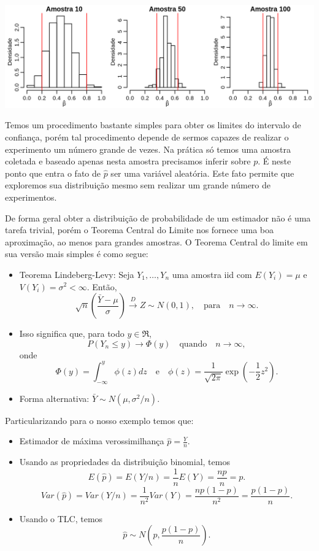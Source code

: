 \documentclass[10pt,a4paper]{book}
\providecommand{\tightlist}{%
  \setlength{\itemsep}{0pt}\setlength{\parskip}{0pt}}
\begin{document}
\begin{center}\includegraphics[width=0.99\linewidth]{figures/unnamed-chunk-382-1} \end{center}

Temos um procedimento bastante simples para obter os limites do
intervalo de confiança, porém tal procedimento depende de sermos capazes
de realizar o experimento um número grande de vezes. Na prática só temos
uma amostra coletada e baseado apenas nesta amostra precisamos inferir
sobre \(p\). É neste ponto que entra o fato de \(\hat{p}\) ser uma
variável aleatória. Este fato permite que exploremos sua distribuição
mesmo sem realizar um grande número de experimentos.

De forma geral obter a distribuição de probabilidade de um estimador não
é uma tarefa trivial, porém o Teorema Central do Limite nos fornece uma
boa aproximação, ao menos para grandes amostras. O Teorema Central do
limite em sua versão mais simples é como segue:

\begin{itemize}
\tightlist
\item
  Teorema Lindeberg-Levy: Seja \(Y_1, \ldots, Y_n\) uma amostra iid com
  \(E(Y_i) = \mu\) e \(V(Y_i) = \sigma^2 < \infty\). Então,
  \[ \sqrt{n}\left ( \frac{\bar{Y} - \mu}{\sigma} \right ) \overset{D}{\to} Z \sim N(0,1), \quad \text{para} \quad n \to \infty.\]
\item
  Isso significa que, para todo \(y \in \Re\),
  \[ P(Y_n \leq y) \to \Phi (y) \quad \text{quando} \quad n \to \infty,\]
  onde \[ \Phi(y) = \int_{-\infty}^y \phi(z) dz \quad \text{e} \quad 
    \phi(z) = \frac{1}{\sqrt{2\pi}} \exp \left ( -\frac{1}{2} z^2 \right ).\]
\item
  Forma alternativa: \(\bar{Y} \sim N(\mu, \sigma^2/n).\)
\end{itemize}

Particularizando para o nosso exemplo temos que:

\begin{itemize}
\tightlist
\item
  Estimador de máxima verossimilhança \(\hat{p} = \frac{Y}{n}.\)
\item
  Usando as propriedades da distribuição binomial, temos
  \[E(\hat{p}) = E(Y/n) = \frac{1}{n}E(Y) = \frac{np}{n} = p.\]
  \[Var(\hat{p}) = Var(Y/n) = \frac{1}{n^2}Var(Y) = \frac{np(1-p)}{n^2} = \frac{p(1-p)}{n}.\]
\item
  Usando o TLC, temos \[\hat{p} \sim N(p, \frac{p(1-p)}{n}).\]
\end{itemize}
\end{document}
